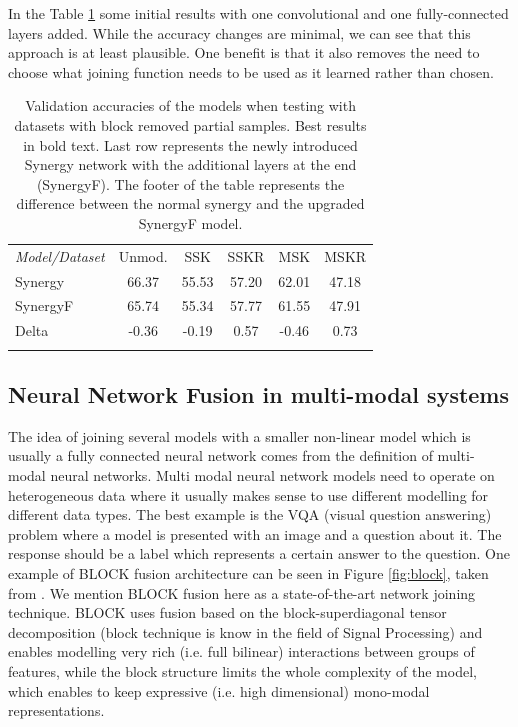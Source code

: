 \documentclass[b5paper]{book}
\let\cite\parencite
\begin{document}
In the Table \ref{tab:synergyfc} some initial results with one convolutional and one fully-connected layers added. While the accuracy changes are minimal, we can see that this approach is at least plausible. One benefit is that it also removes the need to choose what joining function needs to be used as it learned rather than chosen.

\begin{table}
\centering
\caption{Validation accuracies of the models when testing with datasets with block removed partial samples. Best results in bold text. Last row represents the newly introduced Synergy network with the additional layers at the end (SynergyF). The footer of the table represents the difference between the normal synergy and the upgraded SynergyF model.}
\label{tab:synergyfc}
\tabcolsep=0.06cm
\begin{tabular}{lccccc}
\hline\noalign{\smallskip}
\emph{Model/Dataset} & Unmod. & SSK & SSKR & MSK & MSKR \\
\noalign{\smallskip}\hline\noalign{\smallskip}
Synergy & 66.37 & 55.53 & 57.20 & 62.01 & 47.18 \\
SynergyF & 65.74 & 55.34 & 57.77 & 61.55 & 47.91 \\
\noalign{\smallskip}\hline
Delta & -0.36 & -0.19 & 0.57 & -0.46 & 0.73 \\
\hline\noalign{\smallskip}
\end{tabular}
\end{table}

\subsection{Neural Network Fusion in multi-modal systems}


The idea of joining several models with a smaller non-linear model which is usually a fully connected neural network comes from the definition of multi-modal neural networks. Multi modal neural network models need to operate on heterogeneous data where it usually makes sense to use different modelling for different data types. The best example is the VQA (visual question answering) problem where a model is presented with an image and a question about it. The response should be a label which represents a certain answer to the question. One example of BLOCK \cite{ben2019block} fusion architecture can be seen in Figure \ref{fig:block}, taken from \cite{ben2019block}. We mention BLOCK fusion here as a state-of-the-art network joining technique. BLOCK uses fusion based on the block-superdiagonal tensor decomposition  (block technique is know in the field of Signal Processing) and enables modelling very rich (i.e. full bilinear) interactions between groups of features, while the block structure
limits the whole complexity of the model, which enables to
keep expressive (i.e. high dimensional) mono-modal representations.
\end{document}
